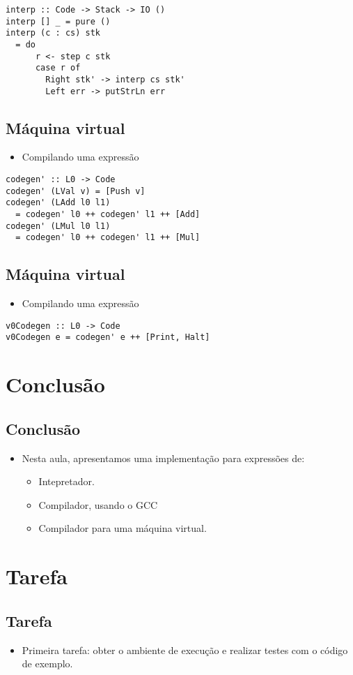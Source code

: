 \documentclass[11pt]{article}
\begin{document}
\begin{verbatim}
interp :: Code -> Stack -> IO () 
interp [] _ = pure ()
interp (c : cs) stk 
  = do 
      r <- step c stk
      case r of 
        Right stk' -> interp cs stk'
        Left err -> putStrLn err 
\end{verbatim}
\subsection*{Máquina virtual}
\label{sec:orgb936bea}

\begin{itemize}
\item Compilando uma expressão
\end{itemize}

\begin{verbatim}
codegen' :: L0 -> Code 
codegen' (LVal v) = [Push v]
codegen' (LAdd l0 l1) 
  = codegen' l0 ++ codegen' l1 ++ [Add]
codegen' (LMul l0 l1) 
  = codegen' l0 ++ codegen' l1 ++ [Mul]
\end{verbatim}
\subsection*{Máquina virtual}
\label{sec:orgd55511a}

\begin{itemize}
\item Compilando uma expressão
\end{itemize}

\begin{verbatim}
v0Codegen :: L0 -> Code 
v0Codegen e = codegen' e ++ [Print, Halt]
\end{verbatim}
\section*{Conclusão}
\label{sec:org607c88f}

\subsection*{Conclusão}
\label{sec:org5983d65}

\begin{itemize}
\item Nesta aula, apresentamos uma implementação para expressões de:
\begin{itemize}
\item Intepretador.
\item Compilador, usando o GCC
\item Compilador para uma máquina virtual.
\end{itemize}
\end{itemize}
\section*{Tarefa}
\label{sec:org7fb5c4a}

\subsection*{Tarefa}
\label{sec:org20a67d0}

\begin{itemize}
\item Primeira tarefa: obter o ambiente de execução e realizar testes com o código de exemplo.
\end{itemize}
\end{document}
